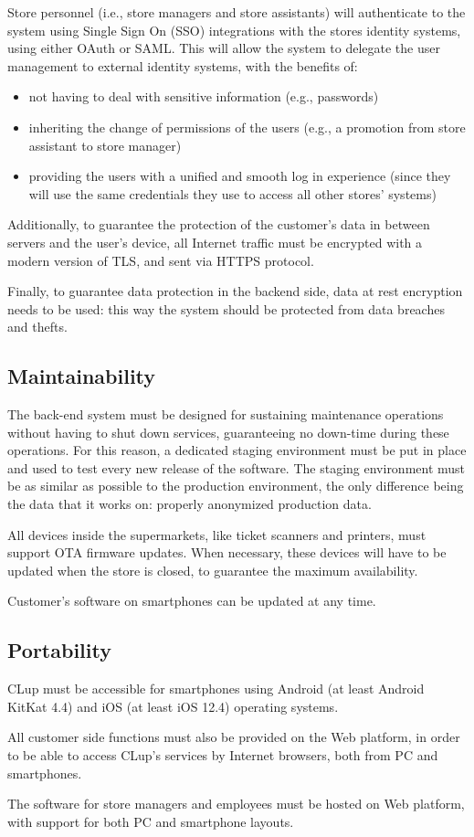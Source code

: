 \documentclass[../../main.tex]{subfiles}
\begin{document}
	Store personnel (i.e., store managers and store assistants) will authenticate to the system using Single Sign On (SSO) integrations with the stores identity systems, using either OAuth or SAML. This will allow the system to delegate the user management to external identity systems, with the benefits of:
	\begin{itemize}
		\item not having to deal with sensitive information (e.g., passwords) \\
		\item inheriting the change of permissions of the users (e.g., a promotion from store assistant to store manager) \\
		\item providing the users with a unified and smooth log in experience (since they will use the same credentials they use to access all other stores' systems)
	\end{itemize}

	Additionally, to guarantee the protection of the customer's data in between servers and the 
	user's device, all Internet traffic must be encrypted with a modern version of TLS, and sent via HTTPS protocol.

	Finally, to guarantee data protection in the backend side, data at rest encryption needs to be used: this way the system should be protected 
	from data breaches and thefts.

	\subsection{Maintainability}

	The back-end system must be designed for sustaining maintenance operations without having to 
	shut down services, guaranteeing no down-time during these operations. For this reason, a dedicated staging environment must be put in place and used to test every new release of the software. The staging environment must be as similar as possible to the production environment, the only difference being the data that it works on: properly anonymized production data.

	All devices inside the supermarkets, like ticket scanners and printers, must support OTA firmware updates. When necessary, these devices will have to be updated when the store is closed, to guarantee the maximum availability.

	Customer's software on smartphones can be updated at any time.

	\subsection{Portability}

	CLup must be accessible for smartphones using Android (at least Android KitKat 4.4) and iOS (at least iOS 12.4) operating systems.

	All customer side functions must also be provided on the Web platform, in order to be able to access 
	CLup's services by Internet browsers, both from PC and smartphones.

	The software for store managers and employees must be hosted on Web platform, with support for both PC and smartphone layouts.

	
\end{document}
